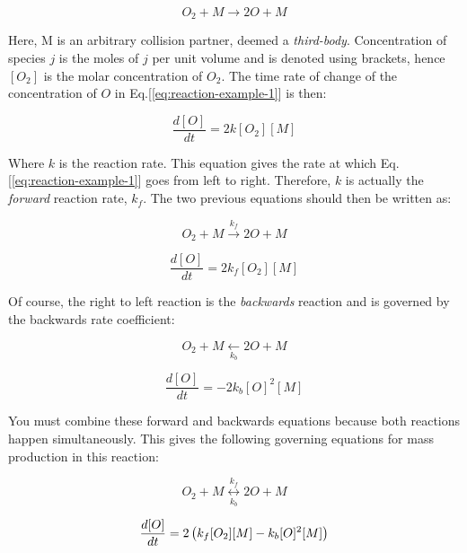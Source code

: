 \documentclass[10pt]{article}
\begin{document}
\begin{flushleft}
\begin{equation}
    O_2 + M \longrightarrow 2O + M
    \label{eq:reaction-example-1}
\end{equation} 

Here, M is an arbitrary collision partner, deemed a \textit{third-body}. Concentration of species $j$ is the moles of $j$ per unit volume and is denoted using brackets, hence $[O_2]$ is the molar concentration of $O_2$. The time rate of change of the concentration of $O$ in Eq.[\ref{eq:reaction-example-1}] is then:

\begin{equation}
    \frac{d [O]}{dt} = 2k [O_2][M]
\end{equation}

Where $k$ is the reaction rate. This equation gives the rate at which Eq. [\ref{eq:reaction-example-1}] goes from left to right. Therefore, $k$ is actually the \textit{forward} reaction rate, $k_f$. The two previous equations should then be written as:

\begin{equation}    
    O_2 + M \overset{k_f}{\longrightarrow} 2O + M
\end{equation} 

\begin{equation}
    \frac{d [O]}{dt} = 2k_f [O_2][M]
\end{equation}

Of course, the right to left reaction is the \textit{backwards} reaction and is governed by the backwards rate coefficient:

\begin{equation}
    O_2 + M \underset{k_b}{\longleftarrow} 2O + M
\end{equation}

\begin{equation}
    \frac{d [O]}{dt} = -2 k_b [O]^2[M]
\end{equation}

You must combine these forward and backwards equations because both reactions happen simultaneously. This gives the following governing equations for mass production in this reaction:

\begin{equation}
    O_2 + M \overset{k_f}{\underset{k_b}{\longleftrightarrow}} 2O + M
\end{equation}

\begin{equation}
    \frac{d [O]}{dt} = 2 \left( k_f [O_2][M] - k_b [O]^2[M] \right)
\end{equation}


\end{flushleft}
\end{document}
